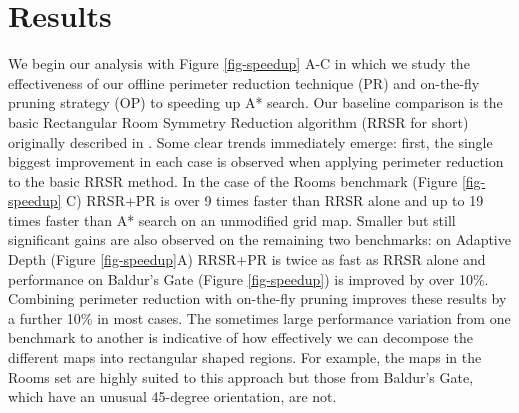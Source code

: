 \section{Results}
\label{sec-results}


We begin our analysis with Figure \ref{fig-speedup} A-C in which we study the 
effectiveness of our offline perimeter reduction technique (PR) and on-the-fly 
pruning strategy (OP) to speeding up A* search. 
Our baseline comparison is the basic Rectangular Room Symmetry Reduction algorithm 
(RRSR for short) originally described in \cite{harabor10}.
Some clear trends immediately emerge: first, the single biggest improvement in each
case is observed when applying perimeter reduction to the basic RRSR method.
In the case of the Rooms benchmark (Figure \ref{fig-speedup} C) RRSR+PR is over 9
times faster than RRSR alone and up to 19 times faster than A* search on an unmodified
grid map.
Smaller but still significant gains are also observed on the remaining two benchmarks:
on Adaptive Depth (Figure \ref{fig-speedup}A) RRSR+PR is twice as fast as RRSR alone
and performance on Baldur's Gate (Figure \ref{fig-speedup}) is improved by over 10\%.
Combining perimeter reduction with on-the-fly pruning improves these results by a further
10\% in most cases.
The sometimes large performance variation from one benchmark to another is indicative
of how effectively we can decompose the different maps into rectangular shaped regions.
For example, the maps in the Rooms set are highly suited to this approach but those
from Baldur's Gate, which have an unusual 45-degree orientation, are not.
